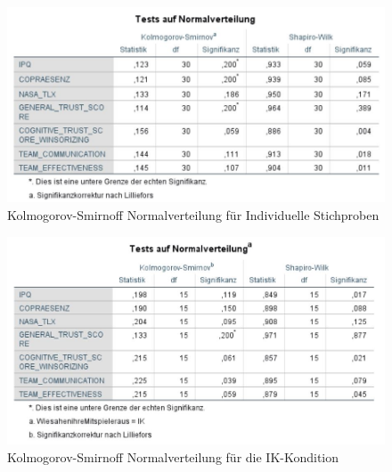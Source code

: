 \documentclass[a4paper,11pt]{article}%
\renewcommand{\\}{\vspace*{0.5\baselineskip} \newline}
\begin{document}
	\begin{figure}[H]
		\begin{footnotesize}
			\includegraphics[width=\textwidth]{Abbildungen/Post_QuestionnaireStatistiks/Normalverteilung_30}\\
			\caption{Kolmogorov-Smirnoff Normalverteilung für Individuelle Stichproben}
			\label{fig:KolSmirInd}
		\end{footnotesize}
	\end{figure}	
	
	\begin{figure}[H]
		\begin{footnotesize}
			\includegraphics[width=\textwidth]{Abbildungen/Post_QuestionnaireStatistiks/Normalverteilung_15_IK}\\
			\caption{Kolmogorov-Smirnoff Normalverteilung für die IK-Kondition}
			\label{fig:KolSmirIndIK}
		\end{footnotesize}
	\end{figure}	
	
\end{document}
